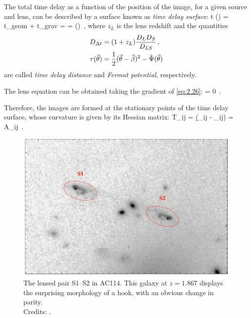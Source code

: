 The total time delay as a function of the position of the image, for a given source and lens, can be described by a surface known as \emph{time delay surface}:
\be
\label{eq:2.26}
t (\va{\t}) = t_{geom} + t_{grav} =    =  \tau (\va{\t}) \,,
\ee
where $z_L$ is the lens redshift and the quantities
\begin{subequations}
\begin{align}
    \label{eq:2.27a}
    D_{\Delta t} & = (1 + z_L) \frac{D_L D_S}{D_{LS}} \,,
    \\
    \label{eq:2.27b}
    \tau (\va{\theta}) & = \frac{1}{2} (\va{\theta} - \va{\beta})^2 - \hat{\Psi} (\va{\theta})
\end{align}
\end{subequations}
are called \emph{time delay distance} and \emph{Fermat potential}, respectively.

The lens equation can be obtained taking the gradient of \cref{eq:2.26}:
\be
\label{eq:2.28}
\va{\nabla}  = 0 \,.
\ee

Therefore, the images are formed at the stationary points of the time delay surface, whose curvature is given by its Hessian matrix:
\be
\label{eq:2.29}
T_{ij} =  \propto (\d_{ij} - \hat{\P}_{ij}) = A_{ij} \,.
\ee

\begin{figure}[b!]
    \centering
    \includegraphics[width=0.9\linewidth, keepaspectratio]{img//chapter2/lensedpair.png}
    \caption[The lensed pair S1–S2 in AC114]{The lensed pair S1–S2 in AC114. This galaxy at $z = 1.867$ displays the surprising morphology of a hook, with an obvious change in parity.\\\small{Credits: \cite{kneib_cluster_2011}.}}
    \label{fig:lensedpair}
\end{figure}

